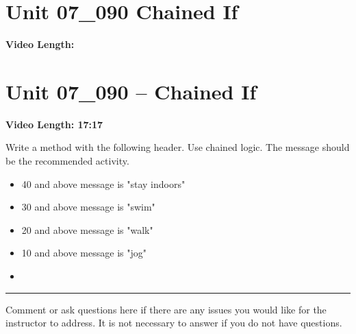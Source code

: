 \documentclass[letterpaper,12pt]{exam}
\newcommand{\unit}{Unit 07}
\begin{document}
\begin{questions}
\section*{\unit\_090 Chained If} %
\noindent \textbf{Video Length: }



\section*{\unit\_090 -- Chained If} %
\noindent \textbf{Video Length: 17:17}

\begin{samepage}
    \question Write a method with the following header.  Use chained logic.  The message should be the recommended activity.
      \begin{itemize} 
        \item 40 and above message is "stay indoors"
        \item 30 and above message is "swim"
        \item 20 and above message is "walk"
        \item 10 and above message is "jog"
        \vspace{5mm}
        \item 
        \vspace{5mm}
       \end{itemize}
\end{samepage}

\begin{samepage}
    \begin{center}
    \rule{0.8\textwidth}{.4pt}
    \end{center}
	\question Comment or ask questions here if there are any issues you would like for the instructor to address.  It is not necessary to answer if you do not have questions.
	\vspace{30mm}
\end{samepage}

\end{questions}
\end{document}
